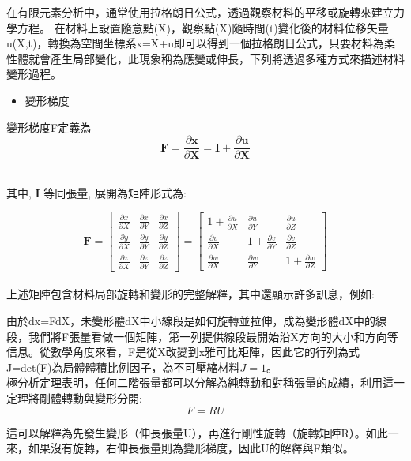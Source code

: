 在有限元素分析中，通常使用拉格朗日公式，透過觀察材料的平移或旋轉來建立力學方程。
在材料上設置隨意點(X)，觀察點(X)隨時間(t)變化後的材料位移矢量u(X,t)，轉換為空間坐標系x=X+u即可以得到一個拉格朗日公式，只要材料為柔性體就會產生局部變化，此現象稱為應變或伸長，下列將透過多種方式來描述材料變形過程。\\

\begin{itemize}
\item 變形梯度
\end{itemize}

變形梯度F定義為
$$\mathbf{F}=\frac{\partial \mathbf{x}}{\partial \mathbf{X}}=\mathbf{I}+\frac{\partial \mathbf{u}}{\partial \mathbf{X}}$$\

其中, $\mathbf{I}$ 等同張量, 展開為矩陣形式為:\

$$\mathbf{F}=\left[\begin{array}{lll}
\frac{\partial x}{\partial X} & \frac{\partial x}{\partial Y} & \frac{\partial x}{\partial Z} \\
\frac{\partial y}{\partial X} & \frac{\partial y}{\partial Y} & \frac{\partial y}{\partial Z} \\
\frac{\partial z}{\partial X} & \frac{\partial z}{\partial Y} & \frac{\partial z}{\partial Z}
\end{array}\right]=\left[\begin{array}{ccc}
1+\frac{\partial u}{\partial X} & \frac{\partial u}{\partial Y} & \frac{\partial u}{\partial Z} \\
\frac{\partial v}{\partial X} & 1+\frac{\partial v}{\partial Y} & \frac{\partial v}{\partial Z} \\
\frac{\partial w}{\partial X} & \frac{\partial w}{\partial Y} & 1+\frac{\partial w}{\partial Z}
\end{array}\right]$$
\\

上述矩陣包含材料局部旋轉和變形的完整解釋，其中還顯示許多訊息，例如:\

由於dx=FdX，未變形體dX中小線段是如何旋轉並拉伸，成為變形體dX中的線段，我們將F張量看做一個矩陣，第一列提供線段最開始沿X方向的大小和方向等信息。從數學角度來看，F是從X改變到x雅可比矩陣，因此它的行列為式J=det(F)為局體體積比例因子，為不可壓縮材料$J=1$。\\

極分析定理表明，任何二階張量都可以分解為純轉動和對稱張量的成績，利用這一定理將剛體轉動與變形分開:\
$$F=R U$$

這可以解釋為先發生變形（伸長張量U），再進行剛性旋轉（旋轉矩陣R）。如此一來，如果沒有旋轉，右伸長張量則為變形梯度，因此U的解釋與F類似。\\

